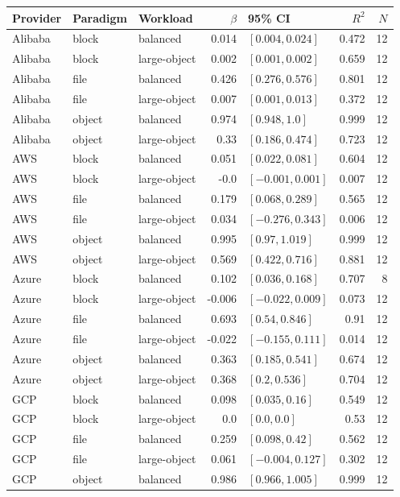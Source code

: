 \begin{tabular}{lllrlrr}
\toprule
Provider & Paradigm & Workload & $\beta$ & 95\% CI & $R^2$ & $N$ \\
\midrule
Alibaba & block & balanced & 0.014 & $[0.004, 0.024]$ & 0.472 & 12 \\
Alibaba & block & large-object & 0.002 & $[0.001, 0.002]$ & 0.659 & 12 \\
Alibaba & file & balanced & 0.426 & $[0.276, 0.576]$ & 0.801 & 12 \\
Alibaba & file & large-object & 0.007 & $[0.001, 0.013]$ & 0.372 & 12 \\
Alibaba & object & balanced & 0.974 & $[0.948, 1.0]$ & 0.999 & 12 \\
Alibaba & object & large-object & 0.33 & $[0.186, 0.474]$ & 0.723 & 12 \\
AWS & block & balanced & 0.051 & $[0.022, 0.081]$ & 0.604 & 12 \\
AWS & block & large-object & -0.0 & $[-0.001, 0.001]$ & 0.007 & 12 \\
AWS & file & balanced & 0.179 & $[0.068, 0.289]$ & 0.565 & 12 \\
AWS & file & large-object & 0.034 & $[-0.276, 0.343]$ & 0.006 & 12 \\
AWS & object & balanced & 0.995 & $[0.97, 1.019]$ & 0.999 & 12 \\
AWS & object & large-object & 0.569 & $[0.422, 0.716]$ & 0.881 & 12 \\
Azure & block & balanced & 0.102 & $[0.036, 0.168]$ & 0.707 & 8 \\
Azure & block & large-object & -0.006 & $[-0.022, 0.009]$ & 0.073 & 12 \\
Azure & file & balanced & 0.693 & $[0.54, 0.846]$ & 0.91 & 12 \\
Azure & file & large-object & -0.022 & $[-0.155, 0.111]$ & 0.014 & 12 \\
Azure & object & balanced & 0.363 & $[0.185, 0.541]$ & 0.674 & 12 \\
Azure & object & large-object & 0.368 & $[0.2, 0.536]$ & 0.704 & 12 \\
GCP & block & balanced & 0.098 & $[0.035, 0.16]$ & 0.549 & 12 \\
GCP & block & large-object & 0.0 & $[0.0, 0.0]$ & 0.53 & 12 \\
GCP & file & balanced & 0.259 & $[0.098, 0.42]$ & 0.562 & 12 \\
GCP & file & large-object & 0.061 & $[-0.004, 0.127]$ & 0.302 & 12 \\
GCP & object & balanced & 0.986 & $[0.966, 1.005]$ & 0.999 & 12 \\

\end{tabular}

